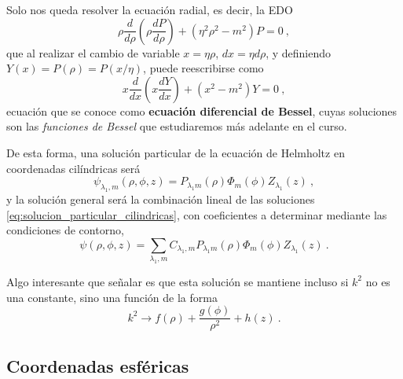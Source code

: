 Solo nos queda resolver la ecuación radial, es decir, la EDO
\begin{equation}
    \rho \frac{d}{d\rho} \left( \rho \frac{dP}{d\rho} \right) + (\eta^2 \rho^2 - m^2)P = 0 \ ,
\end{equation}
que al realizar el cambio de variable $x = \eta\rho$, $dx = \eta d\rho$, y definiendo $Y(x) = P(\rho) = P(x/\eta)$, puede reescribirse como
\begin{equation}
    x \frac{d}{dx}\left( x \frac{dY}{dx} \right) + (x^2 - m^2)Y = 0 \ ,
\end{equation}
ecuación que se conoce como \textbf{ecuación diferencial de Bessel}, cuyas soluciones son las \emph{funciones de Bessel} que estudiaremos más adelante en el curso.

De esta forma, una solución particular de la ecuación de Helmholtz en coordenadas cilíndricas será
\begin{equation} \label{eq:solucion_particular_cilindricas}
    \psi_{\lambda_1, m}(\rho, \phi, z) = P_{\lambda_1 m}(\rho) \Phi_m(\phi) Z_{\lambda_1}(z) \ ,
\end{equation}
y la solución general será la combinación lineal de las soluciones \eqref{eq:solucion_particular_cilindricas}, con coeficientes a determinar mediante las condiciones de contorno,
\begin{equation}
    \psi(\rho, \phi, z) = \sum_{\lambda_1, m} C_{\lambda_1, m} P_{\lambda_1 m}(\rho) \Phi_m(\phi) Z_{\lambda_1}(z) \ .
\end{equation}

Algo interesante que señalar es que esta solución se mantiene incluso si $k^2$ no es una constante, sino una función de la forma
\begin{equation}
    k^2 \to f(\rho) + \frac{g(\phi)}{\rho^2} + h(z) \ .
\end{equation}

\subsection{Coordenadas esféricas}

